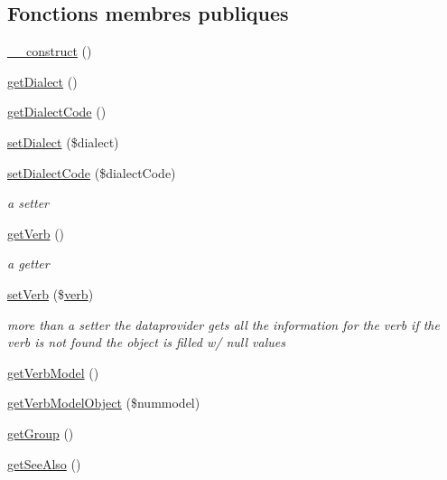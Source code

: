 \subsection*{Fonctions membres publiques}
\begin{DoxyCompactItemize}
\item 
\hyperlink{class_conjugation_manager_base_acd24299a322cb51e4d8ce95e65595f30}{\+\_\+\+\_\+construct} ()
\item 
\hyperlink{class_conjugation_manager_base_a50aa5bd320294aa9683a54dc1b51273f}{get\+Dialect} ()
\item 
\hyperlink{class_conjugation_manager_base_a4f3830c6823fd2add6dc25a69a0e507c}{get\+Dialect\+Code} ()
\item 
\hyperlink{class_conjugation_manager_base_a266802b93062d79fa75c460dc72945d8}{set\+Dialect} (\$dialect)
\item 
\hyperlink{class_conjugation_manager_base_a98c6196247fa40cca8701324bdf36897}{set\+Dialect\+Code} (\$dialect\+Code)
\begin{DoxyCompactList}\small\item\em a setter \end{DoxyCompactList}\item 
\hyperlink{class_conjugation_manager_base_ae6e9d7d21418b8b9831b2b1f29eca4a6}{get\+Verb} ()
\begin{DoxyCompactList}\small\item\em a getter \end{DoxyCompactList}\item 
\hyperlink{class_conjugation_manager_base_a36a53a9f0bc2114a5429bcf9e3cd351e}{set\+Verb} (\$\hyperlink{teibase_8php_aa8d8fadfcf4239c7aa288414da9d0ace}{verb})
\begin{DoxyCompactList}\small\item\em more than a setter the dataprovider gets all the information for the verb if the verb is not found the object is filled w/ null values \end{DoxyCompactList}\item 
\hyperlink{class_conjugation_manager_base_aecf22ced680433bb1c366d0de3931bac}{get\+Verb\+Model} ()
\item 
\hyperlink{class_conjugation_manager_base_a7169d09d7207a9ca1ad4cda9a319effd}{get\+Verb\+Model\+Object} (\$nummodel)
\item 
\hyperlink{class_conjugation_manager_base_a3fca72bd4f7e23d7c7e5a4b3b209387b}{get\+Group} ()
\item 
\hyperlink{class_conjugation_manager_base_a33531e6e7b32ecb2514431628fae41cf}{get\+See\+Also} ()

\end{DoxyCompactItemize}
